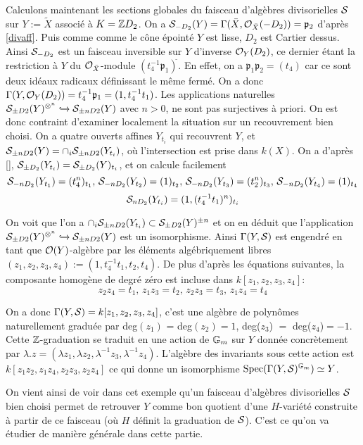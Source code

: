 Calculons maintenant les sections globales du faisceau d'algèbres divisorielles $\mathcal{S}$ sur $Y:=\widetilde{X}$ associé à $K=\mathbb{Z} D_2$. On a $\mathcal{S}_{-D_2}(Y)=\Gamma(\bar{X}, \mathcal{O}_{\bar{X}}(-D_2))=\mathfrak{p}_2$ d'après \ref{divaff}. Puis comme comme le cône épointé $Y$ est lisse, $D_2$ est Cartier dessus. Ainsi $\mathcal{S}_{-D_2}$ est un faisceau inversible sur $Y$ d'inverse $\mathcal{O}_Y(D_2)$, ce dernier étant la restriction à $Y$ du $\mathcal{O}_{\bar{X}}$-module $(t_4^{-1}\mathfrak{p}_1)^{\widetilde{}}$. En effet, on a $\mathfrak{p}_1\mathfrak{p}_2=(t_4)$ car ce sont deux idéaux radicaux définissant le même fermé.  On a donc $\Gamma(Y, \mathcal{O}_Y(D_2))=t_4^{-1}\mathfrak{p}_1=(1, t_4^{-1}t_1)$. Les applications naturelles $\mathcal{S}_{\pm D2}(Y)^{\otimes ^n}\xhookrightarrow{} \mathcal{S}_{\pm nD2}(Y)$ avec $n>0$, ne sont pas surjectives à priori. On est donc contraint d'examiner localement la situation sur un recouvrement bien choisi. On a quatre ouverts affines $Y_{t_i}$ qui recouvrent $Y$, et $\mathcal{S}_{\pm nD2}(Y)=\cap_i \mathcal{S}_{\pm nD2}(Y_{t_i})$, où l'intersection est prise dans $k(X)$. On a d'après \ref{}, $\mathcal{S}_{\pm D_2}(Y_{t_i})=\mathcal{S}_{\pm D_2}(Y)_{t_i}$, et on calcule facilement
$$\mathcal{S}_{-nD_2}(Y_{t_1})=(t_4^n)_{t_1},\,\mathcal{S}_{-nD_2}(Y_{t_2})=(1)_{t_2},\,\mathcal{S}_{-nD_2}(Y_{t_3})=(t_2^n)_{t_3},\,\mathcal{S}_{-nD_2}(Y_{t_4})=(1)_{t_4}$$
$$\mathcal{S}_{nD_2}(Y_{t_i})=(1,(t_4^{-1}t_1)^n)_{t_i}$$

On voit que l'on a $\cap_i \mathcal{S}_{\pm nD2}(Y_{t_i})\subset \mathcal{S}_{\pm D2}(Y)^{\pm n}$ et on en déduit que l'application $\mathcal{S}_{\pm D2}(Y)^{\otimes ^n}\xhookrightarrow{} \mathcal{S}_{\pm nD2}(Y)$ est un isomorphisme. Ainsi $\Gamma(Y,\mathcal{S})$ est engendré en tant que $\mathcal{O}(Y)$-algèbre par les éléments algébriquement libres $(z_1,z_2,z_3,z_4):=(1, t_4^{-1}t_1,t_2,t_4)$. De plus d'après les équations suivantes, la composante homogène de degré zéro est incluse dans $k[z_1,z_2,z_3,z_4]$:
$$ z_2z_4=t_1,\, z_1z_3=t_2,\, z_2z_3=t_3,\, z_1z_4=t_4$$

On a donc $\Gamma(Y, \mathcal{S})=k[z_1,z_2,z_3,z_4]$, c'est une algèbre de polynômes naturellement graduée par deg$(z_1)$ = deg$(z_2)=1$, deg($z_3$) $=$ deg($z_4$)$=-1$. Cette $\mathbb{Z}$-graduation se traduit en une action de $\mathbb{G}_m$ sur $Y$ donnée  concrètement par $\lambda.z=(\lambda z_1,\lambda z_2,\lambda^{-1} z_3,\lambda^{-1} z_4)$. L'algèbre des invariants sous cette action est $k[z_1z_2,z_1z_4,z_2z_3,z_2z_4]$ ce qui donne un isomorphisme $\operatorname{Spec}(\Gamma(Y,\mathcal{S})^{\mathbb{G}_m})\simeq Y$.

On vient ainsi de voir dans cet exemple qu'un faisceau d'algèbres divisorielles $\mathcal{S}$ bien choisi permet de retrouver $Y$ comme bon quotient d'une $H$-variété construite à partir de ce faisceau (où $H$ définit la graduation de $\mathcal{S}$). C'est ce qu'on va étudier de manière générale dans cette partie.

